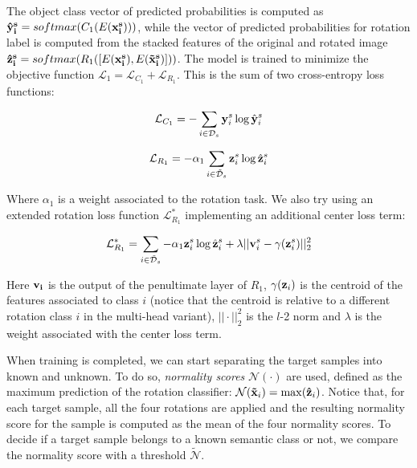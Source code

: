 \documentclass[10pt,twocolumn,letterpaper]{article}
\begin{document}
The object class vector of predicted probabilities is computed as ${\bf \hat{y}_i^s} = softmax(C_1(E({\bf x_i^s})))$, while the vector of predicted probabilities
for rotation label is computed from the stacked features of the original and rotated image ${\bf \hat{z}_i^s} = softmax(R_1([E({\bf x_i^s}), E({\bf \tilde{x}_i^s})]))$.
The model is trained to minimize the objective function $\mathcal{L}_1 = \mathcal{L}_{C_1} + \mathcal{L}_{R_1}$.
This is the sum of two cross-entropy loss functions:

\begin{equation}
  \mathcal{L}_{C_1} = -\sum_{i\in\mathcal{D}_s} {\bf y}_i^s \log \hat{\bf y}_i^s
  \label{eq:baseloss_class}
\end{equation}

\begin{equation}
  \mathcal{L}_{R_1} = -\alpha_1\sum_{i\in\mathcal{\tilde{D}}_s} {\bf z}_i^s \log \hat{{\bf z}}_i^s
  \label{eq:baseloss_rot}
\end{equation}

Where $\alpha_1$ is a weight associated to the rotation task.
We also try using an extended rotation loss function $\mathcal{L}_{R_1}^*$ implementing an additional center loss\cite{CenterLoss} term:

\begin{equation}
  \mathcal{L}_{R_1}^* = \sum_{i\in\mathcal{\tilde{D}}_s} -\alpha_1{\bf z}_i^s \log \hat{{\bf z}}_i^s+\lambda||{\bf v}_i^s-\gamma({\bf z}_i^s)||_2^2
  \label{eq:center_loss}
\end{equation}

Here ${\bf v_i}$ is the output of the penultimate layer of $R_1$,
$\gamma({\bf z}_i)$ is the centroid of the features associated to class $i$
(notice that the centroid is relative to a different rotation class $i$ in the multi-head variant),
$||\cdot||_2^2$ is the $l$-2 norm and $\lambda$ is the weight associated with the center loss term.

When training is completed, 
we can start separating the target samples into known and unknown.
To do so,
{\it normality scores} $\mathcal{N}(\cdot)$ are used,
defined as the maximum prediction of the rotation classifier:
$\mathcal{N}({\bf\tilde{x}}_i) = \max({\bf\hat{z}}_i)$.
Notice that, for each target sample, all the four rotations are applied and the resulting normality score for the sample
is computed as the mean of the four normality scores.
To decide if a target sample belongs to a known semantic class or not, we compare the normality score with a threshold $\tilde{\mathcal{N}}$.
\end{document}
